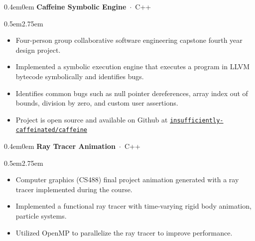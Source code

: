 \documentclass[oneside, 11pt]{memoir}
\newcommand{\entryProject}[4]{
  \begin{adjustwidth}{0.4em}{0em}%
  \textbf{#1}~$\cdot$~#2\sourceatright{\Date \small #3}%
  \begin{adjustwidth}{0.5em}{2.75em}
    \begin{flushleft}
      {
        \Merriweather \small
        #4
      }%
    \end{flushleft}
  \end{adjustwidth}
  \end{adjustwidth}
}
\begin{document}

\entryProject{Caffeine Symbolic Engine}{C++}{Apr 2022}{
  \begin{itemize}
    \item{
      Four-person group collaborative software engineering capstone fourth year design project.
    }
    \item {
      Implemented a symbolic execution engine that executes a program in LLVM bytecode symbolically and identifies bugs.
    }
    \item {
      Identifies common bugs such as null pointer dereferences, array index out of bounds, division by zero, and custom user assertions.
    }
    \item {
      Project is open source and available on Github at \href{https://github.com/insufficiently-caffeinated/caffeine}{\texttt{insufficiently-caffeinated/caffeine}}
    }
  \end{itemize}
}

\entryProject{Ray Tracer Animation}{C++}{Aug 2021}{
  \begin{itemize}
    \item{
      Computer graphics (CS488) final project animation generated with a ray tracer implemented during the course.
    }
    \item {
      Implemented a functional ray tracer with time-varying rigid body animation, particle systems.
    }
    \item {
      Utilized OpenMP to parallelize the ray tracer to improve performance.
    }
  \end{itemize}
}


\end{document}
